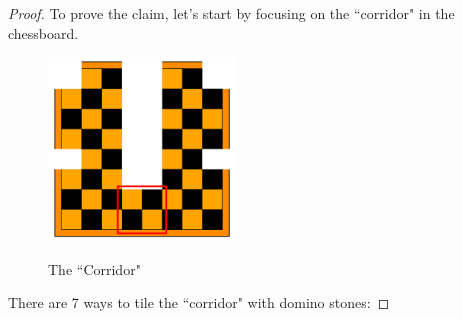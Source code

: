 \documentclass[12pt,a4]{article}
\theoremstyle{exercise}
\begin{document}
\begin{proof}
	To prove the claim, let's start by focusing on the ``corridor" in the chessboard.
    \begin{figure}[h]
        \small
        \centering
        \includegraphics[width=5cm]{corridor.png}
        \label{fig:corridor}
        \caption{The ``Corridor"}
    \end{figure}

    There are 7 ways to tile the ``corridor" with domino stones:


\end{proof}
\end{document}
